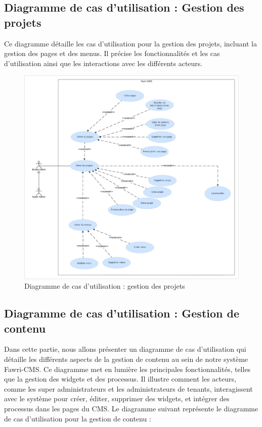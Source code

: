 \subsection{Diagramme de cas d’utilisation : Gestion des projets}

\hspace{\parindent}Ce diagramme détaille les cas d'utilisation pour la gestion des projets, incluant la gestion des pages et des menus. Il précise les fonctionnalités et les cas d'utilisation ainsi que les interactions avec les différents acteurs.



\begin{figure}[H]
  \centering
  \includegraphics[width=17cm]{Figures/use case gestion des projets.png}
  \caption{Diagramme de cas d'utilisation : gestion des projets}
\end{figure}



\subsection{Diagramme de cas d’utilisation : Gestion de contenu}
\hspace{\parindent}Dans cette partie, nous allons présenter un diagramme de cas d'utilisation qui détaille les différents aspects de la gestion de contenu au sein de notre système Fawri-CMS. Ce diagramme met en lumière les principales fonctionnalités, telles que la gestion des widgets et des processus. Il illustre comment les acteurs, comme les super administrateurs et les administrateurs de tenants, interagissent avec le système pour créer, éditer, supprimer des widgets, et intégrer des processus dans les pages du CMS. Le diagramme suivant représente le diagramme de cas d'utilisation pour la gestion de contenu :

